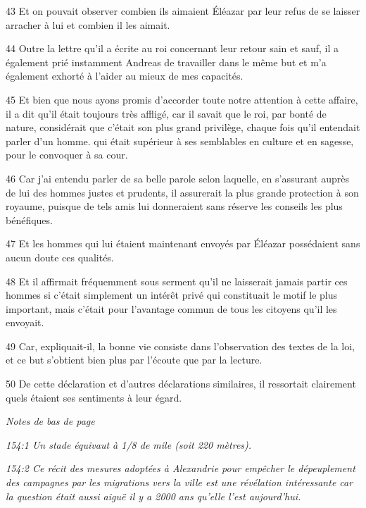 \par 43 Et on pouvait observer combien ils aimaient Éléazar par leur refus de se laisser arracher à lui et combien il les aimait.

\par 44 Outre la lettre qu'il a écrite au roi concernant leur retour sain et sauf, il a également prié instamment Andreas de travailler dans le même but et m'a également exhorté à l'aider au mieux de mes capacités.

\par 45 Et bien que nous ayons promis d'accorder toute notre attention à cette affaire, il a dit qu'il était toujours très affligé, car il savait que le roi, par bonté de nature, considérait que c'était son plus grand privilège, chaque fois qu'il entendait parler d'un homme. qui était supérieur à ses semblables en culture et en sagesse, pour le convoquer à sa cour.

\par 46 Car j'ai entendu parler de sa belle parole selon laquelle, en s'assurant auprès de lui des hommes justes et prudents, il assurerait la plus grande protection à son royaume, puisque de tels amis lui donneraient sans réserve les conseils les plus bénéfiques.

\par 47 Et les hommes qui lui étaient maintenant envoyés par Éléazar possédaient sans aucun doute ces qualités.

\par 48 Et il affirmait fréquemment sous serment qu'il ne laisserait jamais partir ces hommes si c'était simplement un intérêt privé qui constituait le motif le plus important, mais c'était pour l'avantage commun de tous les citoyens qu'il les envoyait.

\par 49 Car, expliquait-il, la bonne vie consiste dans l'observation des textes de la loi, et ce but s'obtient bien plus par l'écoute que par la lecture.

\par 50 De cette déclaration et d'autres déclarations similaires, il ressortait clairement quels étaient ses sentiments à leur égard.

\par \textit{Notes de bas de page}

\par \textit{154:1 Un stade équivaut à 1/8 de mile (soit 220 mètres).}

\par \textit{154:2 Ce récit des mesures adoptées à Alexandrie pour empêcher le dépeuplement des campagnes par les migrations vers la ville est une révélation intéressante car la question était aussi aiguë il y a 2000 ans qu'elle l'est aujourd'hui.}

